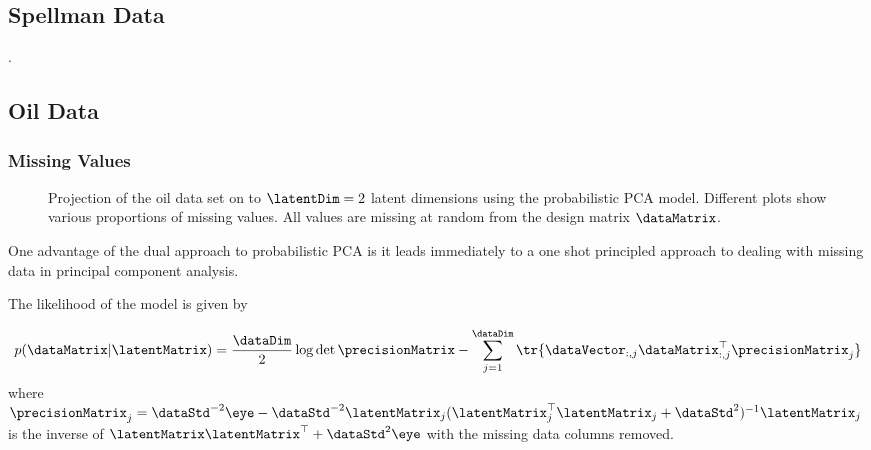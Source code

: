 \subsection{Spellman Data}

.

\subsection{Oil Data}

\subsubsection{Missing Values}

% 
\begin{figure}
  \hfill{}

  \hfill{}

  \caption{Projection of the oil data set on to $\latentDim=2$ latent
    dimensions using the probabilistic PCA model. Different plots show
    various proportions of missing values. All values are missing at
    random from the design matrix $\dataMatrix$.}

\end{figure}

One advantage of the dual approach to probabilistic PCA is it leads immediately to a one shot principled approach to dealing with missing data in principal component analysis.

The likelihood of the model is given by

\[
p(\dataMatrix|\latentMatrix) = \frac{\dataDim}{2}\log\det{\precisionMatrix} - \sum_{j=1}^\dataDim\tr{\dataVector_{:, j}\dataMatrix_{:, j}^\top\precisionMatrix_j}
\]
where $\precisionMatrix_j = \dataStd^{-2} \eye - \dataStd^{-2}\latentMatrix_j(\latentMatrix_j^\top\latentMatrix_j+\dataStd^{2})^{-1}\latentMatrix_j$ is the inverse of $\latentMatrix\latentMatrix^\top + \dataStd^2\eye$ with the missing data columns removed. 

